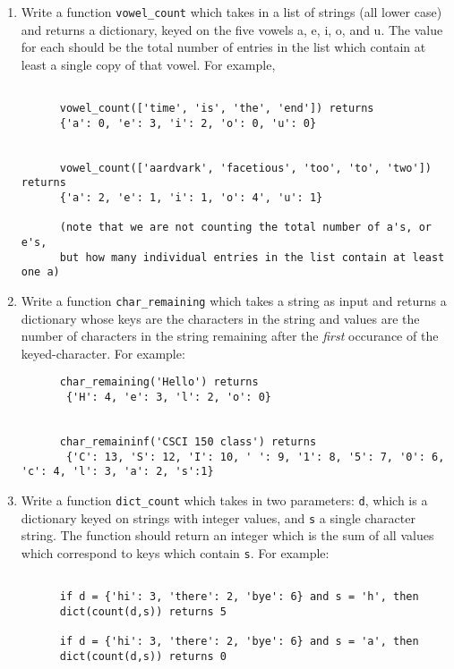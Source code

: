 \documentclass[]{article}
\begin{document}
\begin{enumerate}
\item Write a function \verb|vowel_count| which takes in a list of strings (all lower case) and returns a dictionary, keyed on the five vowels a, e, i, o, and u. The value for each should be the total number of entries in the list which contain at least a single copy of that vowel. For example,
    
    \begin{verbatim}
      
      vowel_count(['time', 'is', 'the', 'end']) returns
      {'a': 0, 'e': 3, 'i': 2, 'o': 0, 'u': 0}
      
      
      vowel_count(['aardvark', 'facetious', 'too', 'to', 'two']) returns
      {'a': 2, 'e': 1, 'i': 1, 'o': 4', 'u': 1}
      
      (note that we are not counting the total number of a's, or e's, 
      but how many individual entries in the list contain at least one a)
    \end{verbatim}


\item  Write a function \texttt{char\_remaining} which takes a string as input and returns a dictionary whose keys are the characters in the string and values are the number of characters in the string remaining after the \emph{first} occurance of the keyed-character.  For example:

    \begin{verbatim}
      char_remaining('Hello') returns
       {'H': 4, 'e': 3, 'l': 2, 'o': 0}


      char_remaininf('CSCI 150 class') returns
       {'C': 13, 'S': 12, 'I': 10, ' ': 9, '1': 8, '5': 7, '0': 6, 'c': 4, 'l': 3, 'a': 2, 's':1}
    \end{verbatim}
    
\item  Write a function \verb|dict_count| which takes in two parameters: \verb|d|, which is a dictionary keyed on strings with integer values, and \verb|s| a single character string. The function should return an integer which is the sum of all values which correspond to keys which contain \verb|s|.  For example:
    
    \begin{verbatim}
      
      if d = {'hi': 3, 'there': 2, 'bye': 6} and s = 'h', then 
      dict(count(d,s)) returns 5
      
      if d = {'hi': 3, 'there': 2, 'bye': 6} and s = 'a', then
      dict(count(d,s)) returns 0
      

\end{verbatim}
\end{enumerate}
\end{document}
